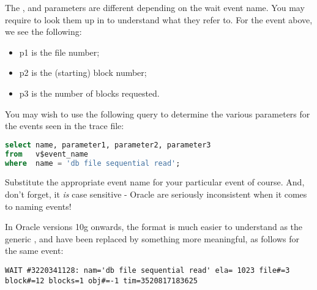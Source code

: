 The ,  and  parameters are different depending on the wait event name. You may require to look them up in  to understand what they refer to. For the event above, we see the following:

\begin{itemize}
\tightlist
\item
  p1 is the file number;
\item
  p2 is the (starting) block number;
\item
  p3 is the number of blocks requested.
\end{itemize}

You may wish to use the following query to determine the various parameters for the  events seen in the trace file:

\begin{lstlisting}[language=SQL,caption={Extracting Event Names for Oracle 9i}]
select name, parameter1, parameter2, parameter3
from   v$event_name
where  name = 'db file sequential read';
\end{lstlisting}

Substitute the appropriate event name for your particular  event of course. And, don't forget, it \emph{is} case sensitive - Oracle are seriously inconsistent when it comes to naming events!

In Oracle versions 10g onwards, the format is much easier to understand as the generic ,  and  have been replaced by something more meaningful, as follows for the same  event:

\begin{lstlisting}[numbers=none,caption={Wait Line - Oracle 10g Onwards}]
WAIT #3220341128: nam='db file sequential read' ela= 1023 file#=3 block#=12 blocks=1 obj#=-1 tim=3520817183625
\end{lstlisting}

